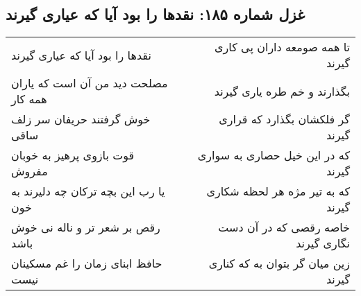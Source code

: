 \begin{center}
\section*{غزل شماره ۱۸۵: نقدها را بود آیا که عیاری گیرند}
\label{sec:sh185}
\begin{longtable}{l p{0.5cm} r}
نقدها را بود آیا که عیاری گیرند
&&
تا همه صومعه داران پی کاری گیرند
\\
مصلحت دید من آن است که یاران همه کار
&&
بگذارند و خم طره یاری گیرند
\\
خوش گرفتند حریفان سر زلف ساقی
&&
گر فلکشان بگذارد که قراری گیرند
\\
قوت بازوی پرهیز به خوبان مفروش
&&
که در این خیل حصاری به سواری گیرند
\\
یا رب این بچه ترکان چه دلیرند به خون
&&
که به تیر مژه هر لحظه شکاری گیرند
\\
رقص بر شعر تر و ناله نی خوش باشد
&&
خاصه رقصی که در آن دست نگاری گیرند
\\
حافظ ابنای زمان را غم مسکینان نیست
&&
زین میان گر بتوان به که کناری گیرند
\\
\end{longtable}
\end{center}
